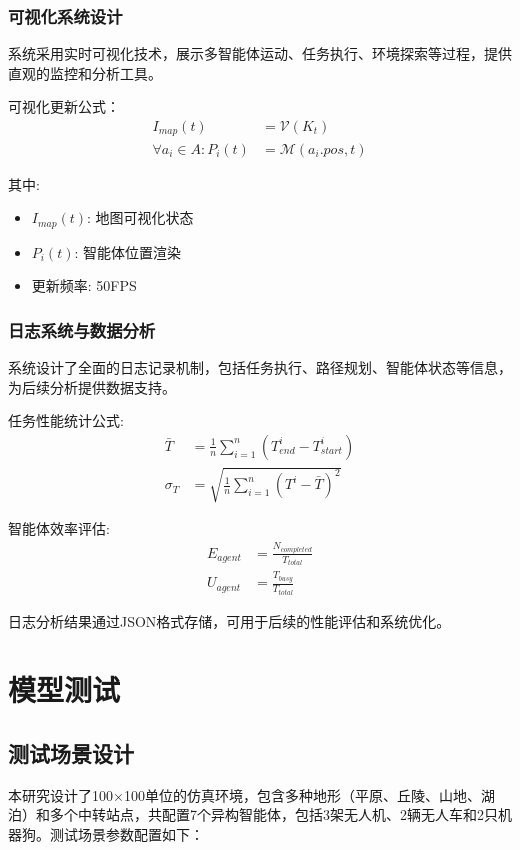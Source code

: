 \documentclass[12pt,a4paper]{article}
\begin{document}
\subsubsection{可视化系统设计}

系统采用实时可视化技术，展示多智能体运动、任务执行、环境探索等过程，提供直观的监控和分析工具。

可视化更新公式：
\begin{align}
I_{map}(t) &= \mathcal{V}(K_t) \\
\forall a_i \in A: P_i(t) &= \mathcal{M}(a_i.pos, t)
\end{align}

其中:
\begin{itemize}
    \item $I_{map}(t)$: 地图可视化状态
    \item $P_i(t)$: 智能体位置渲染
    \item 更新频率: 50FPS
\end{itemize}

\subsubsection{日志系统与数据分析}

系统设计了全面的日志记录机制，包括任务执行、路径规划、智能体状态等信息，为后续分析提供数据支持。

任务性能统计公式:
\begin{align}
\bar{T} &= \frac{1}{n}\sum_{i=1}^{n}(T_{end}^i - T_{start}^i) \\
\sigma_T &= \sqrt{\frac{1}{n}\sum_{i=1}^{n}(T^i - \bar{T})^2}
\end{align}

智能体效率评估:
\begin{align}
E_{agent} &= \frac{N_{completed}}{T_{total}} \\
U_{agent} &= \frac{T_{busy}}{T_{total}}
\end{align}

日志分析结果通过JSON格式存储，可用于后续的性能评估和系统优化。

\section{模型测试}

\subsection{测试场景设计}

本研究设计了100×100单位的仿真环境，包含多种地形（平原、丘陵、山地、湖泊）和多个中转站点，共配置7个异构智能体，包括3架无人机、2辆无人车和2只机器狗。测试场景参数配置如下：
\end{document}
